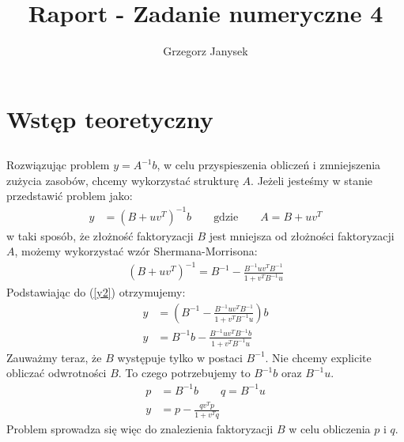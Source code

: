 \documentclass[11pt]{extarticle}
\author{Grzegorz Janysek}
\title{Raport - Zadanie numeryczne 4}
\begin{document}
	\maketitle

	\section{Wstęp teoretyczny}

	\subsection{}
	Rozwiązując problem \( y=A^{-1}b\), w celu przyspieszenia obliczeń i zmniejszenia zużycia zasobów, chcemy wykorzystać strukturę \( A \).
	Jeżeli jesteśmy w stanie przedstawić problem jako:
	\begin{align}
		\label{y2}
		y &= (B + uv^T)^{-1}b \qquad \text{gdzie} \qquad A = B + uv^T
	\end{align}
	w taki sposób, że złożność faktoryzacji \(B\) jest mniejsza od złożności faktoryzacji \(A\),
	możemy wykorzystać wzór Shermana-Morrisona:
	\begin{align}
		(B + uv^T)^{-1} = B^{-1} - \frac{ B^{-1}uv^TB^{-1} }{ 1 + v^TB^{-1}u }
	\end{align}
	Podstawiając do (\ref{y2}) otrzymujemy:
	\begin{align}
		y &= \left( B^{-1} - \frac{ B^{-1}uv^TB^{-1} }{ 1 + v^TB^{-1}u } \right)b \\[12pt]
		y &= B^{-1}b - \frac{ B^{-1}uv^TB^{-1}b }{ 1 + v^TB^{-1}u }
	\end{align}
	Zauważmy teraz, że \(B\) występuje tylko w postaci \(B^{-1}\).
	Nie chcemy explicite obliczać odwrotności \(B\).
	To czego potrzebujemy to \(B^{-1}b\) oraz \(B^{-1}u\).
	\begin{align}
		p &= B^{-1}b \qquad q = B^{-1}u \\[12pt]
		y &= p - \frac{ qv^Tp }{ 1 + v^Tq }
	\end{align}
	Problem sprowadza się więc do znalezienia faktoryzacji \(B\) w celu obliczenia \(p\) i \(q\).

	\pagebreak
\end{document}

